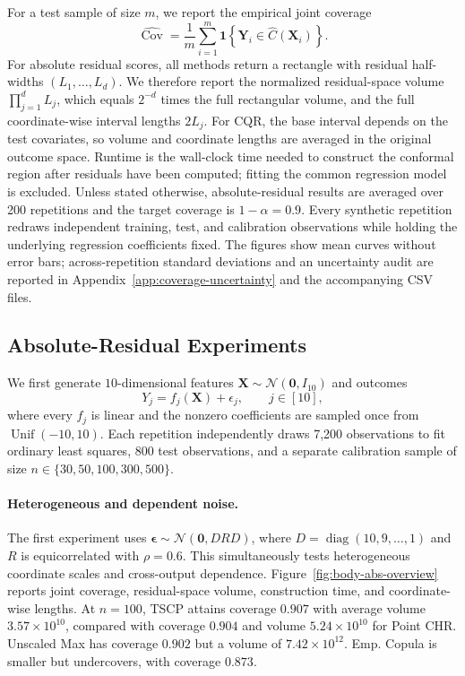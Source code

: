 For a test sample of size $m$, we report the empirical joint coverage
\[
  \widehat{\operatorname{Cov}}
  = \frac{1}{m}\sum_{i=1}^{m}
    \mathbf{1}\!\left\{\boldsymbol{Y}_i
    \in \widehat{C}(\boldsymbol{X}_i)\right\}.
\]
For absolute residual scores, all methods return a rectangle with residual
half-widths $(L_1,\ldots,L_d)$. We therefore report the normalized
residual-space volume $\prod_{j=1}^{d}L_j$, which equals $2^{-d}$ times the
full rectangular volume, and the full coordinate-wise interval lengths
$2L_j$. For CQR, the base interval depends on the test covariates, so volume
and coordinate lengths are averaged in the original outcome space. Runtime is
the wall-clock time needed to construct the conformal region after residuals
have been computed; fitting the common regression model is excluded. Unless
stated otherwise, absolute-residual results are averaged over 200 repetitions
and the target coverage is $1-\alpha=0.9$. Every synthetic repetition redraws
independent training, test, and calibration observations while holding the
underlying regression coefficients fixed. The figures show mean curves
without error bars; across-repetition standard deviations and an uncertainty
audit are reported in Appendix~\ref{app:coverage-uncertainty} and the
accompanying CSV files.

\subsection{Absolute-Residual Experiments}
\label{sec:absolute-residual-experiments}

We first generate $10$-dimensional features
$\boldsymbol{X}\sim\mathcal{N}(\boldsymbol{0},I_{10})$ and outcomes
\[
  Y_j = f_j(\boldsymbol{X}) + \epsilon_j,
  \qquad j\in[10],
\]
where every $f_j$ is linear and the nonzero coefficients are sampled once
from $\operatorname{Unif}(-10,10)$. Each repetition independently draws 7,200
observations to fit ordinary least squares, 800 test observations, and a
separate calibration sample of size
$n\in\{30,50,100,300,500\}$.

\paragraph{Heterogeneous and dependent noise.}
The first experiment uses
$\boldsymbol{\epsilon}\sim\mathcal{N}(\boldsymbol{0},DRD)$, where
$D=\operatorname{diag}(10,9,\ldots,1)$ and $R$ is equicorrelated with
$\rho=0.6$. This simultaneously tests heterogeneous coordinate scales and
cross-output dependence. Figure~\ref{fig:body-abs-overview} reports joint
coverage, residual-space volume, construction time, and coordinate-wise
lengths. At $n=100$, TSCP attains coverage $0.907$ with average volume
$3.57\times10^{10}$, compared with coverage $0.904$ and volume
$5.24\times10^{10}$ for Point CHR. Unscaled Max has coverage $0.902$ but a
volume of $7.42\times10^{12}$. Emp. Copula is smaller but undercovers, with
coverage $0.873$.

